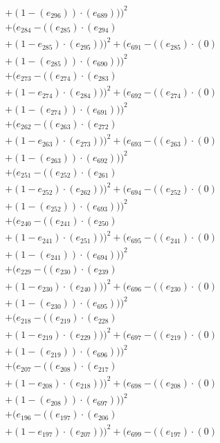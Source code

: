 \documentclass[10pt, a4paper]{article}
\begin{document}
\begin{small}
\begin{align*}
& + (1 - (e_{296})) \cdot (e_{689})))^{2} \\
& + (e_{284} - ((e_{285})  \cdot  (e_{294}) \\
& + (1 - e_{285})  \cdot  (e_{295})))^{2} + (e_{691} - ((e_{285}) \cdot (0) \\
& + (1 - (e_{285})) \cdot (e_{690})))^{2} \\
& + (e_{273} - ((e_{274})  \cdot  (e_{283}) \\
& + (1 - e_{274})  \cdot  (e_{284})))^{2} + (e_{692} - ((e_{274}) \cdot (0) \\
& + (1 - (e_{274})) \cdot (e_{691})))^{2} \\
& + (e_{262} - ((e_{263})  \cdot  (e_{272}) \\
& + (1 - e_{263})  \cdot  (e_{273})))^{2} + (e_{693} - ((e_{263}) \cdot (0) \\
& + (1 - (e_{263})) \cdot (e_{692})))^{2} \\
& + (e_{251} - ((e_{252})  \cdot  (e_{261}) \\
& + (1 - e_{252})  \cdot  (e_{262})))^{2} + (e_{694} - ((e_{252}) \cdot (0) \\
& + (1 - (e_{252})) \cdot (e_{693})))^{2} \\
& + (e_{240} - ((e_{241})  \cdot  (e_{250}) \\
& + (1 - e_{241})  \cdot  (e_{251})))^{2} + (e_{695} - ((e_{241}) \cdot (0) \\
& + (1 - (e_{241})) \cdot (e_{694})))^{2} \\
& + (e_{229} - ((e_{230})  \cdot  (e_{239}) \\
& + (1 - e_{230})  \cdot  (e_{240})))^{2} + (e_{696} - ((e_{230}) \cdot (0) \\
& + (1 - (e_{230})) \cdot (e_{695})))^{2} \\
& + (e_{218} - ((e_{219})  \cdot  (e_{228}) \\
& + (1 - e_{219})  \cdot  (e_{229})))^{2} + (e_{697} - ((e_{219}) \cdot (0) \\
& + (1 - (e_{219})) \cdot (e_{696})))^{2} \\
& + (e_{207} - ((e_{208})  \cdot  (e_{217}) \\
& + (1 - e_{208})  \cdot  (e_{218})))^{2} + (e_{698} - ((e_{208}) \cdot (0) \\
& + (1 - (e_{208})) \cdot (e_{697})))^{2} \\
& + (e_{196} - ((e_{197})  \cdot  (e_{206}) \\
& + (1 - e_{197})  \cdot  (e_{207})))^{2} + (e_{699} - ((e_{197}) \cdot (0) \\

\end{align*}
\end{small}
\end{document}
